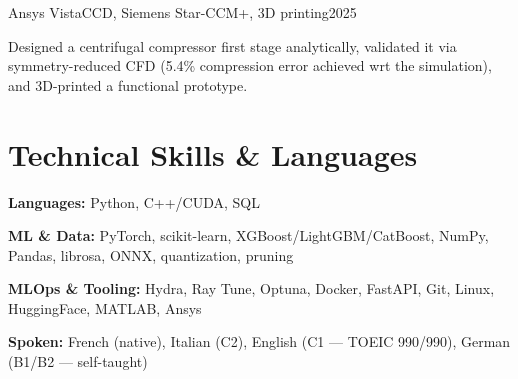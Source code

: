 \documentclass[letterpaper,10pt]{article}
\begin{document}
  {Ansys VistaCCD, Siemens Star-CCM+, 3D printing}{2025}
\begin{bullets}
  \item Designed a centrifugal compressor first stage analytically, validated it via symmetry-reduced CFD (5.4\% compression error achieved wrt the simulation), and 3D-printed a functional prototype.
\end{bullets}

\section{Technical Skills \& Languages}
\begin{bullets}
  \item \textbf{Languages:} Python, C++/CUDA, SQL
  \item \textbf{ML \& Data:} PyTorch, scikit-learn, XGBoost/LightGBM/CatBoost, NumPy, Pandas, librosa, ONNX, quantization, pruning
  \item \textbf{MLOps \& Tooling:} Hydra, Ray Tune, Optuna, Docker, FastAPI, Git, Linux, HuggingFace, MATLAB, Ansys
  \item \textbf{Spoken:} French (native), Italian (C2), English (C1 --- TOEIC 990/990), German (B1/B2 --- self-taught)
\end{bullets}
\end{document}
